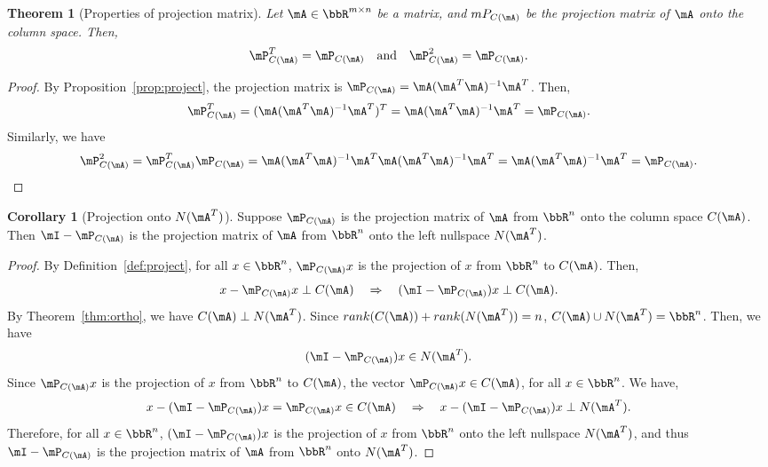 \documentclass[11pt]{article}
\theoremstyle{plain}
\newtheorem{thm}{Theorem}[section]
\theoremstyle{definition}
\newtheorem{cor}{Corollary}
\begin{document}
\begin{thm}[Properties of projection matrix]\label{thm:projectm}
Let $\mA \in \bbR^{m \times n}$ be a matrix, and $mP_{C(\mA)}$ be the projection matrix of $\mA$ onto the column space. Then,
	\begin{equation}\label{eq:projectm}
		\mP_{C(\mA)}^T = \mP_{C(\mA)}\quad \text{and}\quad  \mP_{C(\mA)}^2 = \mP_{C(\mA)}.
	\end{equation}
\end{thm}
\begin{proof}
	By Proposition~\ref{prop:project}, the projection matrix is $\mP_{C(\mA)} =   \mA(\mA^T \mA)^{-1} \mA^T$. Then,
	\[  \mP_{C(\mA)}^T = (\mA(\mA^T \mA)^{-1} \mA^T )^T = \mA (\mA^T \mA)^{-1} \mA^T = \mP_{C(\mA)}. \]
Similarly, we have
	\[  \mP_{C(\mA)}^2 = \mP_{C(\mA)}^T \mP_{C(\mA)} =  \mA (\mA^T \mA)^{-1} \mA^T  \mA (\mA^T \mA)^{-1} \mA^T =  \mA (\mA^T \mA)^{-1} \mA^T = \mP_{C(\mA)}. \]
\end{proof}

\begin{cor}[Projection onto $N(\mA^T)$]\label{cor:iprojectm}
	Suppose $\mP_{C(\mA)}$ is the projection matrix of $\mA$ from $\bbR^n$ onto the column space $C(\mA)$. Then $\mI-\mP_{C(\mA)}$ is the projection matrix of $\mA$ from $\bbR^n$ onto the left nullspace $N(\mA^T)$. 
\end{cor}

\begin{proof}
	By Definition~\ref{def:project}, for all $x \in \bbR^n$, $\mP_{C(\mA)} x$ is the projection of $x$ from $\bbR^n$ to $C(\mA)$. Then,
	\[ x - \mP_{C(\mA)} x \perp C(\mA) \quad \Rightarrow \quad (\mI-\mP_{C(\mA)})x \perp C(\mA). \]
	By Theorem~\ref{thm:ortho}, we have $C(\mA) \perp N(\mA^T)$. Since $rank(C(\mA)) + rank(N(\mA^T)) = n$, $C(\mA)  \cup N(\mA^T) = \bbR^n$. Then, we have
	\[ (\mI-\mP_{C(\mA)})x \in N(\mA^T).\]
	Since $\mP_{C(\mA)} x$ is the projection of $x$ from $\bbR^n$ to $C(\mA)$,  the vector $\mP_{C(\mA)} x \in C(\mA)$, for all  $x \in \bbR^n$. We have,
	\[ x -  (\mI-\mP_{C(\mA)})x = \mP_{C(\mA)} x \in C(\mA) \quad \Rightarrow \quad  x -  (\mI-\mP_{C(\mA)})x \perp N(\mA^T).\]
	Therefore, for all $x \in \bbR^n$, $(\mI-\mP_{C(\mA)})x$ is the projection of $x$ from $\bbR^n$ onto the left nullspace $N(\mA^T)$, and thus $\mI-\mP_{C(\mA)}$ is the projection matrix of $\mA$ from $\bbR^n$ onto $N(\mA^T)$.
\end{proof}
\end{document}
